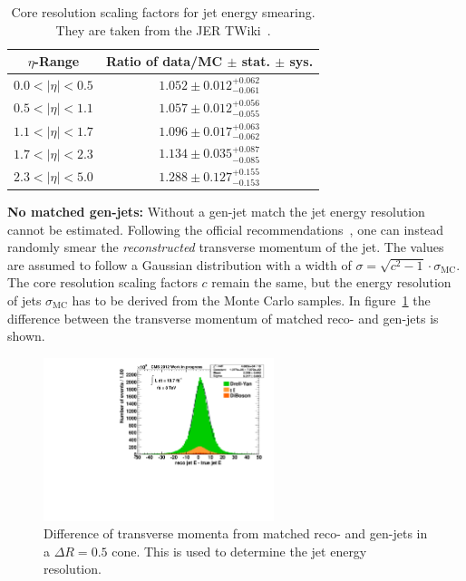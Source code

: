   \begin{table}[htbp!]
    \centering
    {\renewcommand{\arraystretch}{1.2}
      \begin{tabular}{|c|c|}
        \hline
        $\eta$-Range & Ratio of data/MC $\pm$ stat. $\pm$ sys. \\ \hline \hline
        $0.0 < |\eta| < 0.5$ & $1.052 \pm 0.012 ^{+0.062}_{-0.061}$ \\ \hline
        $0.5 < |\eta| < 1.1$ & $1.057 \pm 0.012 ^{+0.056}_{-0.055}$ \\ \hline
        $1.1 < |\eta| < 1.7$ & $1.096 \pm 0.017 ^{+0.063}_{-0.062}$ \\ \hline
        $1.7 < |\eta| < 2.3$ & $1.134 \pm 0.035 ^{+0.087}_{-0.085}$ \\ \hline
        $2.3 < |\eta| < 5.0$ & $1.288 \pm 0.127 ^{+0.155}_{-0.153}$ \\ \hline
      \end{tabular}
    }
    \caption{Core resolution scaling factors for jet energy smearing. They are taken from the JER TWiki~\cite{jer}.}
    \label{tab:jerfactors}
  \end{table}
  
\textbf{No matched gen-jets:} Without a gen-jet match the jet energy resolution cannot be estimated. Following the official recommendations~\cite{jer}, one can instead randomly smear the \textit{reconstructed} transverse momentum of the jet. The values are assumed to follow a Gaussian distribution with a width of $\sigma = \sqrt{c^2-1} \cdot \sigma_{\text{MC}}$. The core resolution scaling factors $c$ remain the same, but the energy resolution of jets $\sigma_{\text{MC}}$ has to be derived from the Monte Carlo samples. In figure~\ref{fig:jerdeltapt} the difference between the transverse momentum of matched reco- and gen-jets is shown.

\begin{figure}[htb!]
  \centering
  \includegraphics[width=0.6\textwidth]{plots/jer_deltapt.pdf}
  \caption{Difference of transverse momenta from matched reco- and gen-jets in a $\Delta R = 0.5$ cone. This is used to determine the jet energy resolution.}
  \label{fig:jerdeltapt}
\end{figure}

